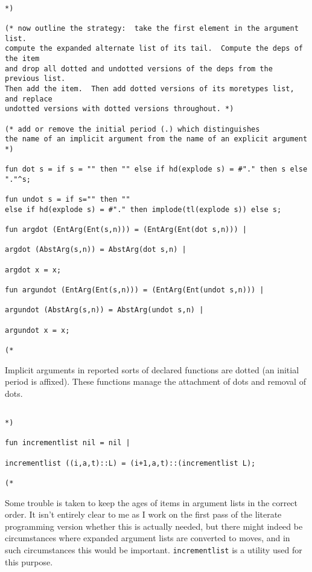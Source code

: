 \documentclass{article}
\begin{document}
\begin{verbatim}

*)

(* now outline the strategy:  take the first element in the argument list.
compute the expanded alternate list of its tail.  Compute the deps of the item
and drop all dotted and undotted versions of the deps from the previous list.
Then add the item.  Then add dotted versions of its moretypes list, and replace
undotted versions with dotted versions throughout. *)

(* add or remove the initial period (.) which distinguishes
the name of an implicit argument from the name of an explicit argument *)

fun dot s = if s = "" then "" else if hd(explode s) = #"." then s else "."^s;

fun undot s = if s="" then "" 
else if hd(explode s) = #"." then implode(tl(explode s)) else s;

fun argdot (EntArg(Ent(s,n))) = (EntArg(Ent(dot s,n))) |

argdot (AbstArg(s,n)) = AbstArg(dot s,n) |

argdot x = x;

fun argundot (EntArg(Ent(s,n))) = (EntArg(Ent(undot s,n))) |

argundot (AbstArg(s,n)) = AbstArg(undot s,n) |

argundot x = x;

(*

\end{verbatim}

Implicit arguments in reported sorts of declared functions are dotted (an initial period is affixed).  These functions manage the attachment of dots and removal of dots.

\begin{verbatim}

*)

fun incrementlist nil = nil |

incrementlist ((i,a,t)::L) = (i+1,a,t)::(incrementlist L);

(*

\end{verbatim}

Some trouble is taken to keep the ages of items in argument lists in the correct order.  It isn't entirely clear to me as I work on the first pass of the literate programming version whether this is actually needed, but there might indeed be circumstances where expanded argument lists are converted to moves, and in such circumstances this would be important.  {\tt incrementlist} is a utility used for this purpose.
\end{document}
